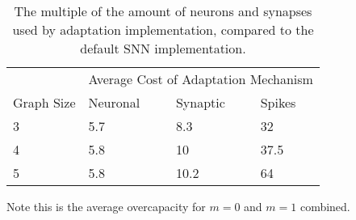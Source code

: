 \begin{table}[H]
\caption{The multiple of the amount of neurons and synapses used by adaptation implementation, compared to the default SNN implementation.}\label{tab:overcapacity}
\begin{tabular}{llll}
           & \multicolumn{3}{l}{Average Cost of Adaptation Mechanism} \\ \cmidrule{2-4}
           Graph Size & Neuronal     & Synaptic & Spikes                   \\ \hline 
3       & 5.7          & 8.3        & 32                \\
4      & 5.8            & 10        & 37.5                  \\
5      & 5.8            & 10.2           & 64              
\end{tabular}
\end{table}\vspace{-1em}
Note this is the average overcapacity for $m=0$ and $m=1$ combined.

